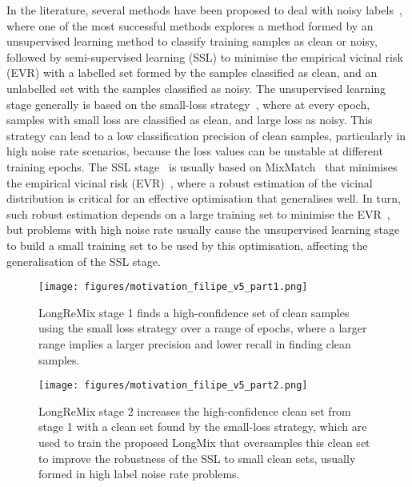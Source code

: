 \documentclass[review]{elsarticle}
\begin{document}
In the literature, several methods have been proposed to deal with noisy labels~\cite{kim2019nlnl, wang2019symmetric, ren2018learning,wang2019symmetric,nguyen2019self,li2020dividemix}, where one of the most successful methods explores a method formed by an unsupervised learning method to classify training samples as clean or noisy, followed by semi-supervised learning (SSL) to minimise the empirical vicinal risk (EVR) with a labelled set formed by the samples classified as clean, and an unlabelled set with the samples classified as noisy.
The unsupervised learning stage generally is based on the small-loss strategy~\cite{yu2019does}, where at every epoch, samples with small loss are classified as clean, and large loss as noisy. 
This strategy can lead to a low classification precision of clean samples, particularly in high noise rate scenarios, because the loss values can be unstable at different training epochs. The SSL stage~\cite{arazo2019unsupervised, nguyen2019self,li2020dividemix} is usually based on MixMatch~\cite{berthelot2019mixmatch} that minimises the empirical vicinal risk (EVR)~\cite{zhang2017mixup}, where a robust estimation of the vicinal distribution is critical for an effective optimisation that generalises well. 
In turn, such robust estimation depends on a large training set to minimise the EVR~\cite{berthelot2019mixmatch,zhang2018generalization}, but problems with high noise rate usually cause the unsupervised learning stage to build a small training set to be used by this optimisation, affecting the generalisation of the SSL stage.



\begin{figure}[!t]
\centering
\texttt{[image: figures/motivation\_filipe\_v5\_part1.png]}
\caption{LongReMix stage 1 finds a high-confidence set of clean samples using the small loss strategy over a range of epochs, where a larger range implies a larger precision and  lower recall in finding clean samples.}
\label{fig:motivation_part1}
\end{figure}


\begin{figure}[!t]
\centering
\texttt{[image: figures/motivation\_filipe\_v5\_part2.png]}
\caption{LongReMix stage 2 increases the high-confidence clean set from stage 1 with a clean set found by the small-loss strategy, which are used to train the proposed LongMix that oversamples this clean set to improve the robustness of the SSL to small clean sets, usually formed in high label noise rate problems.}
\label{fig:motivation_part2}
\end{figure}
\end{document}
